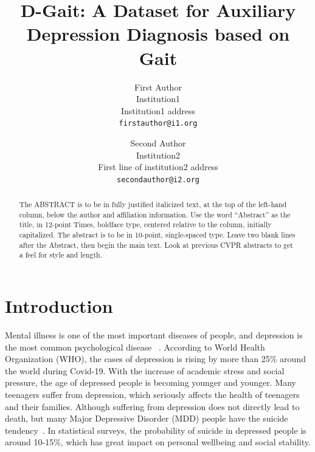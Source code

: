 \documentclass[10pt,twocolumn,letterpaper]{article}
\def\confName{CVPR}
\begin{document}
\title{D-Gait: A Dataset for Auxiliary Depression Diagnosis based on Gait}

\author{First Author\\
Institution1\\
Institution1 address\\
{\tt\small firstauthor@i1.org}
\and
Second Author\\
Institution2\\
First line of institution2 address\\
{\tt\small secondauthor@i2.org}
}
\maketitle

\begin{abstract}
   The ABSTRACT is to be in fully justified italicized text, at the top of the left-hand column, below the author and affiliation information.
   Use the word ``Abstract'' as the title, in 12-point Times, boldface type, centered relative to the column, initially capitalized.
   The abstract is to be in 10-point, single-spaced type.
   Leave two blank lines after the Abstract, then begin the main text.
   Look at previous CVPR abstracts to get a feel for style and length.
\end{abstract}

\section{Introduction}
\label{sec:intro}

Mental illness is one of the most important diseases of people, and depression is the most common psychological disease ~\cite{world2017depression,bhugra2004globalisation,rao2008understanding}.
According to World Health Organization (WHO), the cases of depression is rising by more than 25\% around the world during Covid-19. With the increase of academic stress and social pressure, the age of depressed people is becoming younger and younger. Many teenagers suffer from depression, which seriously affects the health of teenagers and their families.
Although suffering from depression does not directly lead to death, but many Major Depressive Disorder (MDD) people have the suicide tendency~\cite{eisenberg2007prevalence,bergfeld2018treatment,hemming2019alexithymia}.
In statistical surveys, the probability of suicide in depressed people is around 10-15\%, which has great impact on personal wellbeing and social stability.
\end{document}
